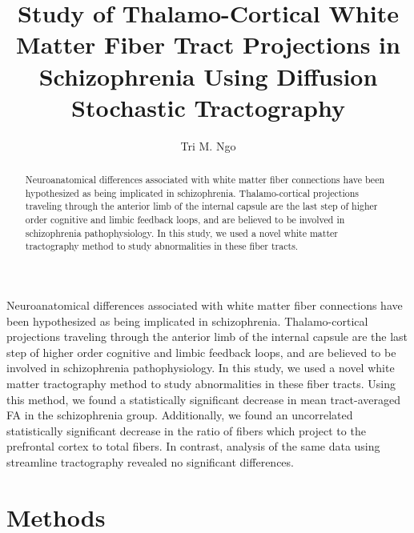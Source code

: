 \documentclass{article}
\author{Tri M. Ngo}
\title{Study of Thalamo-Cortical White Matter Fiber Tract Projections in Schizophrenia Using Diffusion Stochastic Tractography }
\begin{document}
\maketitle

\begin{abstract}
Neuroanatomical differences associated with white matter fiber connections have been hypothesized as being implicated in schizophrenia. Thalamo-cortical projections traveling through the anterior limb of the internal capsule are the last step of higher order cognitive and limbic feedback loops, and are believed to be involved in schizophrenia pathophysiology. In this study, we used a novel white matter tractography method to study abnormalities in these fiber tracts.
\end{abstract}
Neuroanatomical differences associated with white matter fiber connections have been hypothesized as being implicated in schizophrenia. Thalamo-cortical projections traveling through the anterior limb of the internal capsule are the last step of higher order cognitive and limbic feedback loops, and are believed to be involved in schizophrenia pathophysiology. In this study, we used a novel white matter tractography method to study abnormalities in these fiber tracts.  Using this method, we found a statistically significant decrease in mean tract-averaged FA in the schizophrenia group.  Additionally, we found an uncorrelated statistically significant decrease in the ratio of fibers which project to the prefrontal cortex to total fibers.  In contrast, analysis of the same data using streamline tractography revealed no significant differences.

\section{Methods}

  
\end{document}
